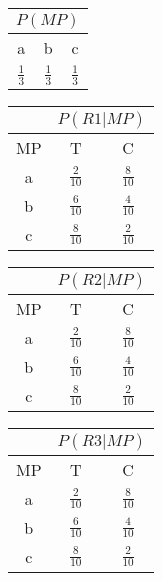 \documentclass{article}
\begin{document}
{\renewcommand{\arraystretch}{1.5}%
\begin{tabular}{|ccc|}
	\hline
	\multicolumn{3}{|c|}{\(P(MP)\)}                          \\ \hline
	\multicolumn{1}{|c|}{a} & \multicolumn{1}{c|}{b} & c \\ \hline
	\multicolumn{1}{|c|}{$\frac{1}{3}$} & \multicolumn{1}{c|}{$\frac{1}{3}$} & {$\frac{1}{3}$} \\ \hline
\end{tabular}} \quad

\vspace{0.3cm}

\begin{minipage}[t]{0.3\textwidth}
	{\renewcommand{\arraystretch}{1.5}%
	\begin{tabular}{|c|cc|}
		\hline
		& \multicolumn{2}{c|}{\(P(R1 | MP)\)}  \\ \hline
		MP & \multicolumn{1}{c|}{T}    & C    \\ \hline
		a  & \multicolumn{1}{c|}{$\frac{2}{10}$} & $\frac{8}{10}$ \\ \hline
		b  & \multicolumn{1}{c|}{$\frac{6}{10}$} & $\frac{4}{10}$ \\ \hline
		c  & \multicolumn{1}{c|}{$\frac{8}{10}$} & $\frac{2}{10}$ \\ \hline
	\end{tabular}} \quad
\end{minipage}
\begin{minipage}[t]{0.3\textwidth}
		{\renewcommand{\arraystretch}{1.5}%
		\begin{tabular}{|c|cc|}
			\hline
			& \multicolumn{2}{c|}{\(P(R2 | MP)\)}  \\ \hline
			MP & \multicolumn{1}{c|}{T}    & C    \\ \hline
			a  & \multicolumn{1}{c|}{$\frac{2}{10}$} & $\frac{8}{10}$ \\ \hline
			b  & \multicolumn{1}{c|}{$\frac{6}{10}$} & $\frac{4}{10}$ \\ \hline
			c  & \multicolumn{1}{c|}{$\frac{8}{10}$} & $\frac{2}{10}$ \\ \hline
	\end{tabular}} \quad
\end{minipage}
\begin{minipage}[t]{0.3\textwidth}
		{\renewcommand{\arraystretch}{1.5}%
		\begin{tabular}{|c|cc|}
			\hline
			& \multicolumn{2}{c|}{\(P(R3 | MP)\)}  \\ \hline
			MP & \multicolumn{1}{c|}{T}    & C    \\ \hline
			a  & \multicolumn{1}{c|}{$\frac{2}{10}$} & $\frac{8}{10}$ \\ \hline
			b  & \multicolumn{1}{c|}{$\frac{6}{10}$} & $\frac{4}{10}$ \\ \hline
			c  & \multicolumn{1}{c|}{$\frac{8}{10}$} & $\frac{2}{10}$ \\ \hline
	\end{tabular}} \quad
\end{minipage}
\end{document}
